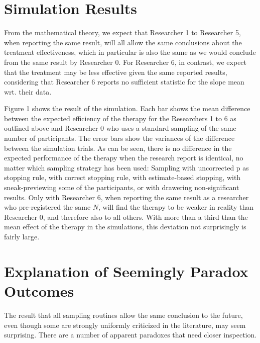 \documentclass[man]{apa7}
\theoremstyle{definition}
\begin{document}
\section{Simulation Results}
From the mathematical theory, we expect that Researcher 1 to Researcher 5, when reporting the same result, will all allow the same conclusions about the treatment effectiveness, which in particular is also the same as we would conclude from the same result by Researcher 0. For Researcher 6, in contrast, we expect that the treatment may be less effective given the same reported results, considering that Researcher 6 reports no sufficient statistic for the slope mean wrt. their data. 

Figure 1 shows the result of the simulation. Each bar shows the mean difference between the expected efficiency of the therapy for the Researchers 1 to 6 as outlined above and Researcher 0 who uses a standard sampling of the same number of participants. The error bars show the variances of the difference between the simulation trials. As can be seen, there is no difference in the expected performance of the therapy when the research report is identical, no matter which sampling strategy has been used: Sampling with uncorrected p as stopping rule, with correct stopping rule, with estimate-based stopping, with sneak-previewing some of the participants, or with drawering non-significant results. Only with Researcher 6, when reporting the same result as a researcher who pre-registered the same $N$, will find the therapy to be weaker in reality than Researcher 0, and therefore also to all others. With more than a third than the mean effect of the therapy in the simulations, this deviation not surprisingly is fairly large. 


\section{Explanation of Seemingly Paradox Outcomes}
The result that all sampling routines allow the same conclusion to the future, even though some are strongly uniformly criticized in the literature, may seem surprising. There are a number of apparent paradoxes that need closer inspection.
\end{document}
